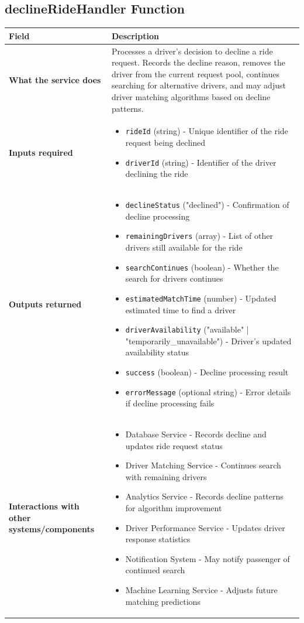 \documentclass[11pt,a4paper]{article}
\begin{document}
\subsection{declineRideHandler Function}

\begin{longtable}{|p{3cm}|p{12cm}|}
\hline
\textbf{Field} & \textbf{Description} \\
\hline
\textbf{What the service does} & 
Processes a driver's decision to decline a ride request. Records the decline reason, removes the driver from the current request pool, continues searching for alternative drivers, and may adjust driver matching algorithms based on decline patterns. \\
\hline
\textbf{Inputs required} & 
\begin{itemize}[nosep]
\item \texttt{rideId} (string) - Unique identifier of the ride request being declined
\item \texttt{driverId} (string) - Identifier of the driver declining the ride
\end{itemize} \\
\hline
\textbf{Outputs returned} & 
\begin{itemize}[nosep]
\item \texttt{declineStatus} ("declined") - Confirmation of decline processing
\item \texttt{remainingDrivers} (array) - List of other drivers still available for the ride
\item \texttt{searchContinues} (boolean) - Whether the search for drivers continues
\item \texttt{estimatedMatchTime} (number) - Updated estimated time to find a driver
\item \texttt{driverAvailability} ("available" | "temporarily\_unavailable") - Driver's updated availability status
\item \texttt{success} (boolean) - Decline processing result
\item \texttt{errorMessage} (optional string) - Error details if decline processing fails
\end{itemize} \\
\hline
\textbf{Interactions with other systems/components} & 
\begin{itemize}[nosep]
\item Database Service - Records decline and updates ride request status
\item Driver Matching Service - Continues search with remaining drivers
\item Analytics Service - Records decline patterns for algorithm improvement
\item Driver Performance Service - Updates driver response statistics
\item Notification System - May notify passenger of continued search
\item Machine Learning Service - Adjusts future matching predictions
\end{itemize} \\
\hline
\end{longtable}
\end{document}
